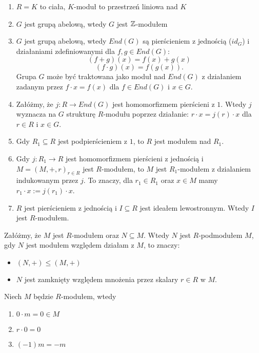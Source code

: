 \begin{enumerate}
    \item $R=K$ to ciała, $K$-moduł to przestrzeń liniowa nad $K$
    \item $G$ jest grupą abelową, wtedy $G$ jest $\mathbb{Z}$-modułem
    \item $G$ jest grupą abelową, wtedy $End(G)$ są pierścieniem z jednością ($id_G$) i działaniami zdefiniowanymi dla $f, g\in End(G)$:
      $$(f+g)(x)=f(x)+g(x)$$
      $$(f\cdot g)(x)=f(g(x)).$$
      Grupa $G$ może być traktowana jako moduł nad $End(G)$ z działaniem zadanym przez $f\cdot x=f(x)$ dla $f\in End(G)$ i $x\in G$.
    \item Załóżmy, że $j:R\to End(G)$ jest homomorfizmem pierścieni z $1$. Wtedy $j$ wyznacza na $G$ strukturę $R$-modułu poprzez działanie: $r\cdot x=j(r)\cdot x$ dla $r\in R$ i $x\in G$.
    \item Gdy $R_1\subseteq R$ jest podpierścieniem z $1$, to $R$ jest modułem nad $R_1$.
    \item Gdy $j:R_1\to R$ jest homomorfizmem pierścieni z jednością i $M=(M,+,r)_{r\in R}$ jest $R$-modułem, to $M$ jest $R_1$-modułem z dzialaniem indukowanym przez $j$. To znaczy, dla $r_1\in R_1$ oraz $x\in M$ mamy $r_1\cdot x:=j(r_1)\cdot x$.
    \item $R$ jest pierścieniem z jednością i $I\subseteq R$ jest ideałem lewostronnym. Wtedy $I$ jest $R$-modułem.
\end{enumerate}

\begin{definition}
  Załóżmy, że $M$ jest $R$-modułem oraz $N\subseteq M$. Wtedy $N$ jest $R$-podmodułem $M$, gdy $N$ jest modułem względem działam z $M$, to znaczy:

  \begin{itemize}
    \item[\PHtunny] $(N, +)\leq (M, +)$
    \item[\PHtunny] $N$ jest zamknięty względem mnożenia przez skalary $r\in R$ w $M$.
  \end{itemize}
\end{definition}

\begin{remark}
    Niech $M$ będzie $R$-modułem, wtedy
    \begin{enumerate}
    \item $0\cdot m=0\in M$
    \item $r\cdot 0=0$
    \item $(-1)m=-m$
    \end{enumerate}
\end{remark}

